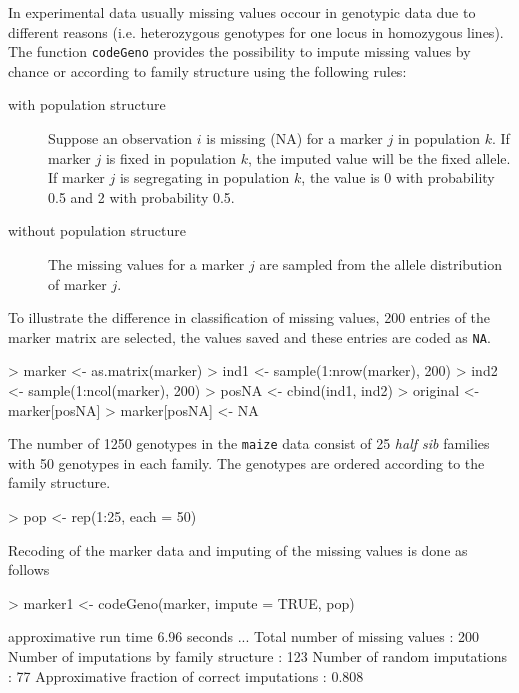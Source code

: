 \documentclass[a4paper,11pt]{article}
\begin{document}
In experimental data usually missing values occour in genotypic data due to different reasons 
(i.e. heterozygous genotypes for one locus in homozygous lines).  
The function \texttt{codeGeno} provides the possibility to impute missing values by chance or according to family structure using the following rules:
\begin{description}
\item[with population structure]
Suppose an observation $i$ is missing (NA) for a marker $j$ in population $k$. If marker $j$ is fixed in population $k$, 
the imputed value will be the fixed allele. If marker $j$ is segregating in population $k$, 
the value is 0 with probability 0.5 and 2 with probability 0.5.
\item[without population structure] The missing values for a marker $j$ are sampled from the allele distribution of marker $j$.
\end{description}           
To illustrate the difference in classification of missing values, 200 entries of the marker matrix are selected, the values saved and these entries are coded as \texttt{NA}. 
\begin{Schunk}
\begin{Sinput}
> marker <- as.matrix(marker)
> ind1 <- sample(1:nrow(marker), 200)
> ind2 <- sample(1:ncol(marker), 200)
> posNA <- cbind(ind1, ind2)
> original <- marker[posNA]
> marker[posNA] <- NA
\end{Sinput}
\end{Schunk}
The number of  1250 genotypes in the \texttt{maize} data consist of 25 \textit{half sib} families with 50 genotypes in each family. The genotypes are ordered according to the family structure. 
\begin{Schunk}
\begin{Sinput}
> pop <- rep(1:25, each = 50)
\end{Sinput}
\end{Schunk}
Recoding of the marker data and imputing of the missing  values is done as follows
\begin{Schunk}
\begin{Sinput}
> marker1 <- codeGeno(marker, impute = TRUE, pop)
\end{Sinput}
\begin{Soutput}
approximative run time  6.96  seconds 
 ... 
Total number of missing values                : 200 
Number of imputations by family structure     : 123 
Number of random imputations                  : 77 
Approximative fraction of correct imputations : 0.808 
\end{Soutput}
\end{Schunk}
\end{document}
